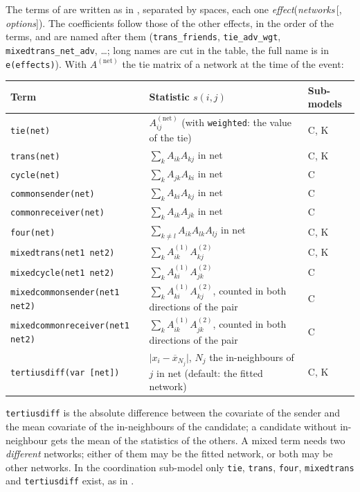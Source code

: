 The terms of  are written as in \goldfish{}, separated by spaces, each one \emph{effect}(\emph{networks}\,[, \emph{options}]). The coefficients follow those of the other effects, in the order of the terms, and are named after them (\texttt{trans\_friends}, \texttt{tie\_adv\_wgt}, \texttt{mixedtrans\_net\_adv}, \ldots; long names are cut in the table, the full name is in \texttt{e(effects)}). With $A^{(\mathrm{net})}$ the tie matrix of a network at the time of the event:
\begin{longtable}{@{}p{5.2cm}p{6.5cm}p{3.2cm}@{}}
\toprule
Term & Statistic $s(i,j)$ & Sub-models\\
\midrule\endhead
\bottomrule\endfoot
\texttt{tie(net)} & $A^{(\mathrm{net})}_{ij}$ (with \texttt{weighted}: the value of the tie) & C, K\\
\texttt{trans(net)} & $\sum_k A_{ik}A_{kj}$ in net & C, K\\
\texttt{cycle(net)} & $\sum_k A_{jk}A_{ki}$ in net & C\\
\texttt{commonsender(net)} & $\sum_k A_{ki}A_{kj}$ in net & C\\
\texttt{commonreceiver(net)} & $\sum_k A_{ik}A_{jk}$ in net & C\\
\texttt{four(net)} & $\sum_{k\neq l}A_{ik}A_{lk}A_{lj}$ in net & C, K\\
\texttt{mixedtrans(net1 net2)} & $\sum_k A^{(1)}_{ik}A^{(2)}_{kj}$ & C, K\\
\texttt{mixedcycle(net1 net2)} & $\sum_k A^{(1)}_{ki}A^{(2)}_{jk}$ & C\\
\texttt{mixedcommonsender(net1 net2)} & $\sum_k A^{(1)}_{ki}A^{(2)}_{kj}$, counted in both directions of the pair & C\\
\texttt{mixedcommonreceiver(net1 net2)} & $\sum_k A^{(1)}_{ik}A^{(2)}_{jk}$, counted in both directions of the pair & C\\
\texttt{tertiusdiff(var [net])} & $\bigl|x_i-\overline{x}_{N_j}\bigr|$, $N_j$ the in-neighbours of $j$ in net (default: the fitted network) & C, K\\
\end{longtable}
\texttt{tertiusdiff} is the absolute difference between the covariate of the sender and the mean covariate of the in-neighbours of the candidate; a candidate without in-neighbour gets the mean of the statistics of the others. A mixed term needs two \emph{different} networks; either of them may be the fitted network, or both may be other networks. In the coordination sub-model only \texttt{tie}, \texttt{trans}, \texttt{four}, \texttt{mixedtrans} and \texttt{tertiusdiff} exist, as in \goldfish{}.

